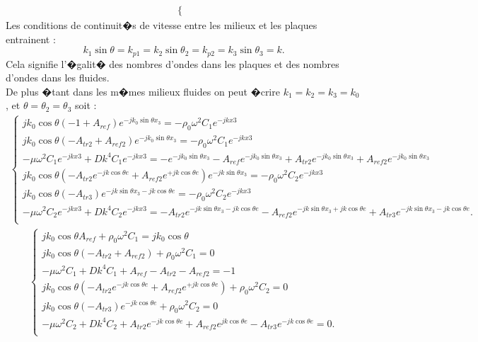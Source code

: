 \documentclass[12pt,foolscap]{report}
\begin{document}
{{\begin{align}
\begin{cases}
\end{cases}
\end{align}
Les conditions de continuit�s de vitesse entre les milieux et les plaques entrainent : 
\begin{equation}
k_1 \sin\theta = k_{p1} = k_2 \sin\theta_2 =k_{p2}= k_3\sin\theta_3=k\text{.}
\end{equation}
Cela signifie l'�galit� des nombres d'ondes dans les plaques et des nombres d'ondes dans les fluides. \\
De plus �tant dans les m�mes milieux fluides on peut �crire $k_1 = k_2 = k_3 = k_0$, et $\theta = \theta_2 =\theta_3$ soit :
\begin{align}
\begin{cases}
j k_0 \cos\theta (-1+A_{ref}) e^{-jk_0\sin\theta x_3} = -\rho_0\omega^2 C_{1}e^{-jkx3}\\
j k_0 \cos\theta (-A_{tr2}+A_{ref2}) e^{-jk_0\sin\theta x_3} = -\rho_0\omega^2 C_{1}e^{-jkx3}\\
-\mu \omega^2C_{1}e^{-jkx3}+Dk^4C_{1}e^{-jkx3} = -e^{-jk_0\sin\theta x_3}-A_{ref}e^{-jk_0\sin\theta x_3}+A_{tr2}e^{-jk_0\sin\theta x_3}+A_{ref2}e^{-jk_0\sin\theta x_3}\\
j k_0 \cos\theta (-A_{tr2}e^{-jk\cos\theta e}+A_{ref2}e^{+jk\cos\theta e})e^{-jk\sin\theta x_3}  = -\rho_0\omega^2 C_{2}e^{-jkx3}\\
j k_0\cos\theta (-A_{tr3}) e^{-jk\sin\theta x_3-jk\cos\theta e} = -\rho_0\omega^2 C_{2}e^{-jkx3}\\
-\mu \omega^2C_{2}e^{-jkx3}+Dk^4C_{2}e^{-jkx3} = -A_{tr2}e^{-jk\sin\theta x_3-jk\cos\theta e}-A_{ref2}e^{-jk\sin\theta x_3+jk\cos\theta e}+A_{tr3}e^{-jk\sin\theta x_3-jk\cos\theta e}\text{.}\\
\end{cases}
\end{align}
\begin{align}
\begin{cases}
j k_0 \cos\theta A_{ref}  +\rho_0\omega^2 C_{1}=j k_0 \cos\theta \\
j k_0 \cos\theta (-A_{tr2}+A_{ref2})  +\rho_0\omega^2 C_{1}=0\\
-\mu \omega^2C_{1}+Dk^4C_{1} +A_{ref} -A_{tr2}-A_{ref2} = -1\\
j k_0 \cos\theta (-A_{tr2}e^{-jk\cos\theta e}+A_{ref2}e^{+jk\cos\theta e}) +\rho_0\omega^2 C_{2} =0\\
j k_0 \cos\theta (-A_{tr3}) e^{-jk\cos\theta e} +\rho_0\omega^2 C_{2}=0\\
-\mu \omega^2C_{2}+Dk^4C_{2} +A_{tr2}e^{-jk\cos\theta e}+A_{ref2}e^{jk\cos\theta e}-A_{tr3}e^{-jk\cos\theta e}=0 \text{.}\\
\end{cases}
\end{align}

}}
\end{document}
